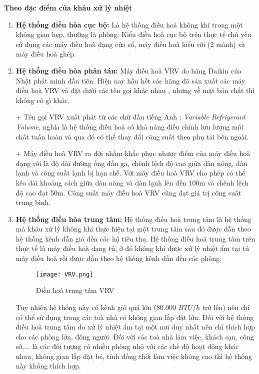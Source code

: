 	\textbf{Theo đặc điểm của khâu xử lý nhiệt}
	\begin{enumerate}[leftmargin=0.5cm]
		\setlength\itemsep{1mm}
		\item \textbf{Hệ thống điều hòa cục bộ:} Là hệ thống điều hoà không khí trong một không gian hẹp, thường là phòng. Kiểu điều hoà cục bộ trên thực tế chủ yếu sử dụng các máy điều hoà dạng cửa sổ, máy điều hoà kiểu rời (2 mảnh) và máy điều hoà ghép.
		\item \textbf{Hệ thống điều hòa phân tán:} Máy điều hoà VRV do hãng Daikin của Nhật phát minh đầu tiên. Hiện nay hầu hết các hãng đã sản xuất các máy điều hoà VRV và đặt dưới các tên gọi khác nhau , nhưng về mặt bản chất thì không có gì khác.
		
	+ Tên gọi VRV xuất phát từ các chữ đầu tiếng Anh : \textit{Variable Refrigerant Volume}, nghĩa là hệ thống điều hoà có khả năng điều chỉnh lưu lượng môi chất tuần hoàn và qua đó có thể thay đổi công suất theo phụ tải bên ngoài.

	+ Máy điều hoà VRV ra đời nhằm khắc phục nhược điểm của máy điều hoà dạng rời là độ dài đường ống dẫn ga, chênh lệch độ cao giữa dàn nóng, dàn lạnh và công suất lạnh bị hạn chế. Với máy điều hoà VRV cho phép có thể kéo dài khoảng cách giữa dàn nóng và dàn lạnh lên đến 100m và chênh lệch độ cao đạt 50m. Công suất máy điều hoà VRV cũng đạt giá trị công suất trung bình.
	
		\item \textbf{Hệ thống điều hòa trung tâm:} Hệ thống điều hoà trung tâm là hệ thống mà khâu xử lý không khí thực hiện tại một trung tâm sau đó được dẫn theo hệ thống kênh dẫn gió đến các hộ tiêu thụ. Hệ thống điều hoà trung tâm trên thực tế là máy điều hoà dạng tủ, ở đó không khí được xử lý nhiệt ẩm tại tủ máy điều hoà rồi được dẫn theo hệ thống kênh dẫn đến các phòng.
		
		\begin{figure}[H]
			\centering
			\texttt{[image: VRV.png]}
			\caption{Điều hoà trung tâm VRV}
		\end{figure}

	Tuy nhiên hệ thống này có kênh gió quá lớn (80.000 $BTU/h$ trở lên) nên chỉ có thể sử dụng trong các toà nhà có không gian lắp đặt lớn. Đối với hệ thống điều hoà trung tâm do xử lý nhiệt ẩm tại một nơi duy nhất nên chỉ thích hợp cho các phòng lớn, đông người. Đối với các toà nhà làm việc, khách sạn, công sở,... là các đối tượng có nhiều phòng nhỏ với các chế độ hoạt động khác nhau, không gian lắp đặt bé, tính đồng thời làm việc không cao thì hệ thống này không thích hợp.
	\end{enumerate}
	
